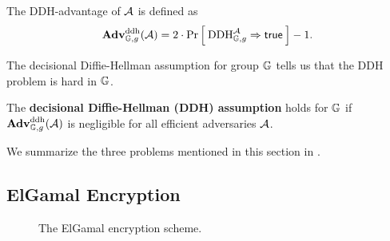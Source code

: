 \begin{center}

\end{center}

The DDH-advantage of ${\mathcal A}$ is defined as 
\begin{equation*}
\mathbf{Adv}^{\mathrm{ddh}}_{\mathbb{G}, g}({\mathcal A}) = 2 \cdot \Pr\left[\: \textnormal{DDH}_{\mathbb{G}, g}^{\mathcal A}\Rightarrow\mathsf{true} \:\right] - 1.
\end{equation*}

The decisional Diffie-Hellman assumption for group $\mathbb{G}$ tells us that the DDH problem is hard in $\mathbb{G}$. 

\begin{definition}
	The \textbf{decisional Diffie-Hellman (DDH) assumption} holds for $\mathbb{G}$ if $\mathbf{Adv}^{\mathrm{ddh}}_{\mathbb{G}, g}({\mathcal A})$ is negligible for all efficient adversaries ${\mathcal A}$.
\end{definition}

We summarize the three problems mentioned in this section in . 

\subsection{ElGamal Encryption}

\begin{figure}
	\center
	\caption{The ElGamal encryption scheme.}
	\label{fig:elgamal}
\end{figure}

